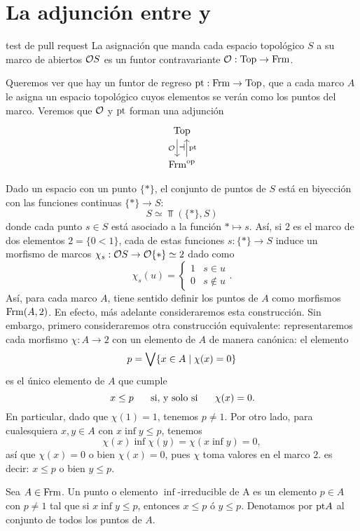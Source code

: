 \chapter{La adjunción entre  y }

test de pull request
La asignación que manda cada espacio topológico $S$ a su marco de
abiertos $\cal OS$ es un funtor contravariante
$\cal O:\Top\to\Frm$.

Queremos ver que hay un funtor de regreso $\pt:\Frm\to\Top$, que
a cada marco $A$ le asigna un espacio topológico cuyos elementos
se verán como los puntos del marco.
Veremos que $\cal O$ y $\pt$ forman una adjunción
\[
\begin{tikzcd}
\Top \ar[d,shift right=2,"\cal O"'{name=L}]
\\
\Frm^\op \ar[u,shift right=2,"\pt"'{name=R}]
\adj{L}{R}
\end{tikzcd}
\]

Dado un espacio con un punto $\{*\}$, el conjunto de
puntos de $S$ está en biyección con las funciones continuas
$\{*\}\to S$:
\[
  S \simeq \Top(\{*\},S)
\]
donde cada punto $s\in S$ está asociado a la función $*\mapsto
s$.
Así, si $2$ es el marco de dos elementos $2=\{0<1\}$,
cada de estas funciones $s:\{*\}\to S$ induce un morfismo de
marcos $\chi_s:\cal OS\to\cal O\{*\}\simeq 2$ dado como
\[
  \chi_s(u) =
  \begin{cases}
    1 & s\in u \\
    0 & s\not\in u
  \end{cases}
.\]
Así, para cada marco $A$, tiene sentido definir los puntos de $A$
como morfismos $\Frm(A,2)$.
En efecto, más adelante consideraremos esta construcción.
Sin embargo, primero consideraremos otra construcción equivalente:
representaremos cada morfismo $\chi:A\to 2$ con un elemento de
$A$ de manera canónica: el elemento
\[
    p = \Sup\{x\in A\mid \chi(x)=0\}
\]
es el único elemento de $A$ que cumple
\[
    x\leq p \ssi \chi(x) = 0
.\]
En particular, dado que $\chi(1)=1$, tenemos $p\neq 1$.
Por otro lado, para cualesquiera $x,y\in A$ con
$x\inf y\leq p$, tenemos
\[
    \chi(x)\inf\chi(y)=\chi(x\inf y)=0
,\]
así que $\chi(x)=0$ o bien $\chi(x)=0$, pues $\chi$ toma valores
en el marco $2$. es decir: $x\leq p$ o bien $y\leq p$.

\begin{defn}
  Sea $A\in \Frm$. Un punto o elemento $\inf$-irreducible de A es un elemento $p\in A$ con $p\neq 1$ tal que si $x\inf y\leq p$, entonces $x\leq p$ ó $y\leq p$. Denotamos por $\pt A$ al conjunto de todos los puntos de $A$.
\end{defn}



